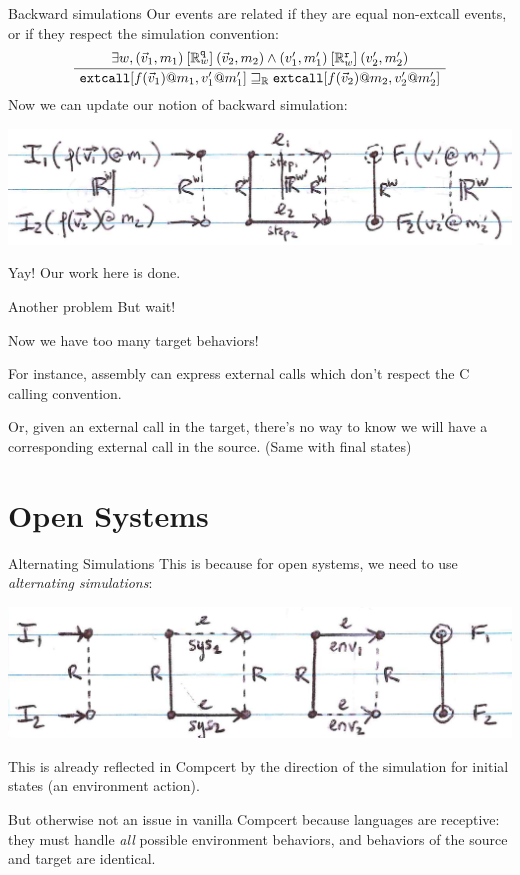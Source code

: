 \documentclass[handout]{beamer}
\newcommand{\kw}[1]{\texttt{#1}}
\begin{document}
\begin{frame}{Backward simulations} %
Our events are related if they are equal non-extcall events,
or if they respect the simulation convention:
\[
  \AxiomC{$
    \exists w,
      (\vec{v}_1, m_1) \:[\mathbb{R}^\kw{q}_w]\: (\vec{v}_2, m_2) \wedge
      (v_1', m_1') \:[\mathbb{R}^\kw{r}_w]\: (v_2', m_2')$}
  \UnaryInfC{$
    \kw{extcall}[f(\vec{v}_1)@m_1, v_1'@m_1']
    \sqsupseteq_\mathbb{R}
    \kw{extcall}[f(\vec{v}_2)@m_2, v_2'@m_2']$}
  \DisplayProof
\]
Now we can update our notion of backward simulation:
\begin{center}
  \includegraphics[scale=.65]{figs/bwsimr}
\end{center}
Yay! Our work here is done.
\end{frame}

\begin{frame}{Another problem} %
But wait!

Now we have too many target behaviors!

For instance,
assembly can express external calls
which don't respect the C calling convention.

Or, given an external call in the target,
there's no way to know we will have a corresponding
external call in the source.
(Same with final states)
\end{frame}

\section{Open Systems}

\begin{frame}{Alternating Simulations} %
This is because for open systems,
we need to use \emph{alternating simulations}:
\begin{center}
  \includegraphics[scale=.65]{figs/altsim}
\end{center}
This is already reflected in Compcert
by the direction of the simulation for initial states
(an environment action).

But otherwise not an issue in vanilla Compcert
because languages are receptive:
they must handle \emph{all} possible environment
behaviors,
and behaviors of the source and target are identical.
\end{frame}
\end{document}
